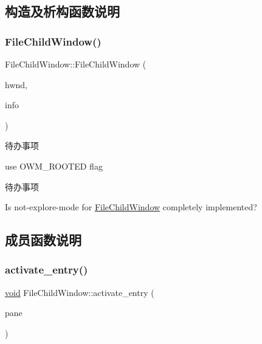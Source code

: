 \subsection{构造及析构函数说明}
\mbox{\label{struct_file_child_window_a3c224e72029662287701798a817342b0}} 
\subsubsection{\texorpdfstring{File\+Child\+Window()}{FileChildWindow()}}
{\footnotesize\ttfamily File\+Child\+Window\+::\+File\+Child\+Window (\begin{DoxyParamCaption}\item[{\hyperlink{interfacevoid}{H\+W\+ND}}]{hwnd,  }\item[{const \hyperlink{struct_file_child_wnd_info}{File\+Child\+Wnd\+Info} \&}]{info }\end{DoxyParamCaption})}

\begin{DoxyRefDesc}{待办事项}
\item[\hyperlink{todo__todo000027}{待办事项}]use O\+W\+M\+\_\+\+R\+O\+O\+T\+ED flag \end{DoxyRefDesc}


\begin{DoxyRefDesc}{待办事项}
\item[\hyperlink{todo__todo000028}{待办事项}]Is not-\/explore-\/mode for \hyperlink{struct_file_child_window}{File\+Child\+Window} completely implemented? \end{DoxyRefDesc}


\subsection{成员函数说明}
\mbox{\label{struct_file_child_window_a32a45a31f8f8ea8d9a2cf9f0a06553aa}} 
\subsubsection{\texorpdfstring{activate\+\_\+entry()}{activate\_entry()}}
{\footnotesize\ttfamily \hyperlink{interfacevoid}{void} File\+Child\+Window\+::activate\+\_\+entry (\begin{DoxyParamCaption}\item[{\hyperlink{struct_pane}{Pane} $\ast$}]{pane }\end{DoxyParamCaption})\hspace{0.3cm}{\ttfamily [protected]}}

